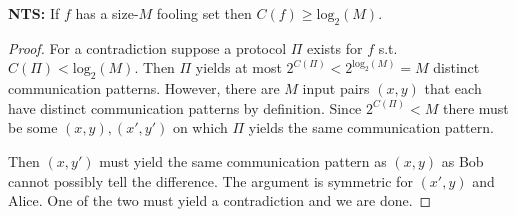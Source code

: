 \textbf{NTS:} If $f$ has a size-$M$ fooling set then $C(f) \geq \text{log}_2(M)$.
\begin{proof}
For a contradiction suppose a protocol $\Pi$ exists for $f$ s.t. $C(\Pi) < \text{log}_2(M)$.
\pause
Then $\Pi$ yields at most $2^{C(\Pi)} < 2^{\text{log}_2(M)} = M$
distinct communication patterns.
\pause
However, there are $M$ input pairs $(x, y)$ that each have distinct communication patterns by definition.
\pause
Since $2^{C(\Pi)} < M$ there must be some $(x, y), (x', y')$ on which $\Pi$ yields the same communication pattern.

\medskip

\pause
Then $(x, y')$ must yield the same communication pattern as $(x, y)$
as Bob cannot possibly tell the difference.  The argument is symmetric for $(x', y)$ and Alice.  One of the two must yield a contradiction and we are done.
\end{proof}